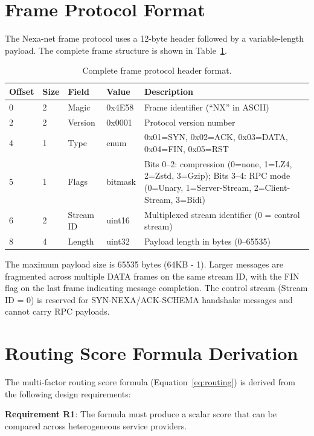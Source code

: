 \appendix

\section{Frame Protocol Format}

The Nexa-net frame protocol uses a 12-byte header followed by a variable-length payload. The complete frame structure is shown in Table~\ref{tab:frame-full}.

\begin{table}[h]
\centering
\begin{tabular}{@{}llllp{5cm}@{}}
\toprule
Offset & Size & Field & Value & Description \\
\midrule
0 & 2 & Magic & 0x4E58 & Frame identifier (``NX'' in ASCII) \\
2 & 2 & Version & 0x0001 & Protocol version number \\
4 & 1 & Type & enum & 0x01=SYN, 0x02=ACK, 0x03=DATA, 0x04=FIN, 0x05=RST \\
5 & 1 & Flags & bitmask & Bits 0--2: compression (0=none, 1=LZ4, 2=Zstd, 3=Gzip); Bits 3--4: RPC mode (0=Unary, 1=Server-Stream, 2=Client-Stream, 3=Bidi) \\
6 & 2 & Stream ID & uint16 & Multiplexed stream identifier (0 = control stream) \\
8 & 4 & Length & uint32 & Payload length in bytes (0--65535) \\
\bottomrule
\end{tabular}
\caption{Complete frame protocol header format.}
\label{tab:frame-full}
\end{table}

The maximum payload size is 65535 bytes (64KB - 1). Larger messages are fragmented across multiple DATA frames on the same stream ID, with the FIN flag on the last frame indicating message completion. The control stream (Stream ID = 0) is reserved for SYN-NEXA/ACK-SCHEMA handshake messages and cannot carry RPC payloads.

\section{Routing Score Formula Derivation}

The multi-factor routing score formula (Equation~\ref{eq:routing}) is derived from the following design requirements:

\textbf{Requirement R1}: The formula must produce a scalar score that can be compared across heterogeneous service providers.

